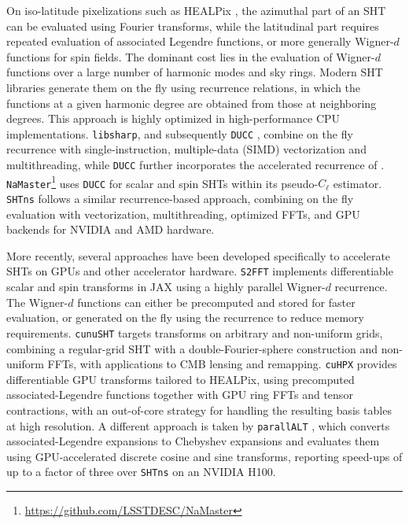 \documentclass[letters,usenatbib,useAMS]{mnras}
\begin{document}
On iso-latitude pixelizations such as HEALPix \citep{gorski2005}, the azimuthal part of an SHT can be evaluated using Fourier transforms, while the latitudinal part requires repeated evaluation of associated Legendre functions, or more generally Wigner-$d$ functions for spin fields. The dominant cost lies in the evaluation of Wigner-$d$ functions over a large number of harmonic modes and sky rings. Modern SHT libraries generate them on the fly using recurrence relations, in which the functions at a given harmonic degree are obtained from those at neighboring degrees. This approach is highly optimized in high-performance CPU implementations. \texttt{libsharp}, and subsequently \texttt{DUCC} \citep{reinecke2013}, combine on the fly recurrence with single-instruction, multiple-data (SIMD) vectorization and multithreading, while \texttt{DUCC} further incorporates the accelerated recurrence of \citet{ishioka2018}. \texttt{NaMaster}\footnote{\url{https://github.com/LSSTDESC/NaMaster}} \citep{alonso2019} uses \texttt{DUCC} for scalar and spin SHTs within its pseudo-$C_\ell$ estimator. \texttt{SHTns} \citep{schaeffer2013,ishioka2018} follows a similar recurrence-based approach, combining on the fly evaluation with vectorization, multithreading, optimized FFTs, and GPU backends for NVIDIA and AMD hardware.

More recently, several approaches have been developed specifically to accelerate SHTs on GPUs and other accelerator hardware. \texttt{S2FFT} \citep{price2024} implements differentiable scalar and spin transforms in JAX using a highly parallel Wigner-$d$ recurrence. The Wigner-$d$ functions can either be precomputed and stored for faster evaluation, or generated on the fly using the recurrence to reduce memory requirements. \texttt{cunuSHT} \citep{belkner2024} targets transforms on arbitrary and non-uniform grids, combining a regular-grid SHT with a double-Fourier-sphere construction and non-uniform FFTs, with applications to CMB lensing and remapping. \texttt{cuHPX} \citep{cheng2025cuhpxgpuaccelerateddifferentiablespherical} provides differentiable GPU transforms tailored to HEALPix, using precomputed associated-Legendre functions together with GPU ring FFTs and tensor contractions, with an out-of-core strategy for handling the resulting basis tables at high resolution. A different approach is taken by \texttt{parallALT} \citep{tolmachev2026}, which converts associated-Legendre expansions to Chebyshev expansions and evaluates them using GPU-accelerated discrete cosine and sine transforms, reporting speed-ups of up to a factor of three over \texttt{SHTns} on an NVIDIA H100.
\end{document}
